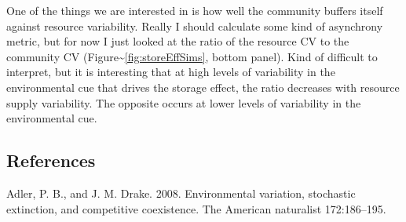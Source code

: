 \documentclass[12pt,]{article}
\begin{document}
One of the things we are interested in is how well the community buffers
itself against resource variability. Really I should calculate some kind
of asynchrony metric, but for now I just looked at the ratio of the
resource CV to the community CV
(Figure\textasciitilde{}\ref{fig:storeEffSims}, bottom panel). Kind of
difficult to interpret, but it is interesting that at high levels of
variability in the environmental cue that drives the storage effect, the
ratio decreases with resource supply variability. The opposite occurs at
lower levels of variability in the environmental cue.

\pagebreak{}

\subsection{References}\label{references}

Adler, P. B., and J. M. Drake. 2008. Environmental variation, stochastic
extinction, and competitive coexistence. The American naturalist
172:186--195.
\end{document}
